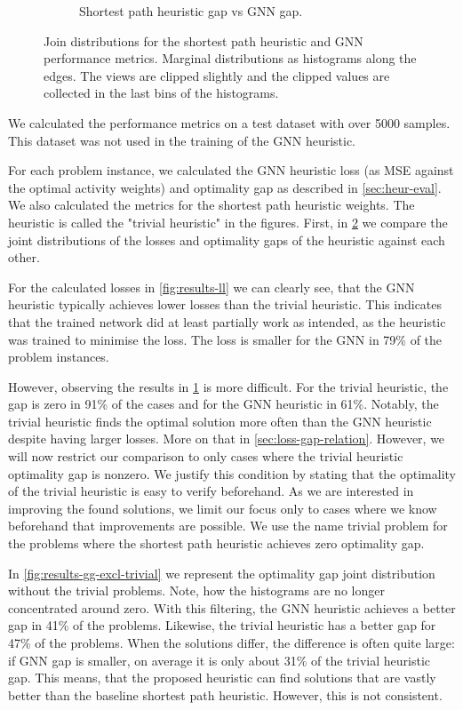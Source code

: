 \documentclass[english, 12pt, a4paper, sci, utf8, a-2b, online]{aaltothesis}
\begin{document}
\begin{figure}
\begin{subfigure}{0.5\textwidth}
        \caption{Shortest path heuristic gap vs GNN gap.}
        \label{fig:results-gg}
    \end{subfigure}
    \caption{Join distributions for the shortest path heuristic and GNN performance metrics. Marginal distributions as histograms along the edges. The views are clipped slightly and the clipped values are collected in the last bins of the histograms.}
    \label{fig:results-ll-gg}
\end{figure}

We calculated the performance metrics on a test dataset with over 5000 samples. This dataset was not used in the training of the GNN heuristic.

For each problem instance, we calculated the GNN heuristic loss (as MSE against the optimal activity weights) and optimality gap as described in \cref{sec:heur-eval}. We also calculated the metrics for the shortest path heuristic weights. The heuristic is called the "trivial heuristic" in the figures. First, in \cref{fig:results-ll-gg} we compare the joint distributions of the losses and optimality gaps of the heuristic against each other.

For the calculated losses in \cref{fig:results-ll} we can clearly see, that the GNN heuristic typically achieves lower losses than the trivial heuristic. This indicates that the trained network did at least partially work as intended, as the heuristic was trained to minimise the loss. The loss is smaller for the GNN in 79\% of the problem instances.

However, observing the results in \cref{fig:results-gg} is more difficult. For the trivial heuristic, the gap is zero in 91\% of the cases and for the GNN heuristic in 61\%. Notably, the trivial heuristic finds the optimal solution more often than the GNN heuristic despite having larger losses. More on that in \cref{sec:loss-gap-relation}. However, we will now restrict our comparison to only cases where the trivial heuristic optimality gap is nonzero. We justify this condition by stating that the optimality of the trivial heuristic is easy to verify beforehand. As we are interested in improving the found solutions, we limit our focus only to cases where we know beforehand that improvements are possible. We use the name trivial problem for the problems where the shortest path heuristic achieves zero optimality gap.

In \cref{fig:results-gg-excl-trivial} we represent the optimality gap joint distribution without the trivial problems. Note, how the histograms are no longer concentrated around zero. With this filtering, the GNN heuristic achieves a better gap in 41\% of the problems. Likewise, the trivial heuristic has a better gap for 47\% of the problems. When the solutions differ, the difference is often quite large: if GNN gap is smaller, on average it is only about 31\% of the trivial heuristic gap. This means, that the proposed heuristic can find solutions that are vastly better than the baseline shortest path heuristic. However, this is not consistent.
\end{document}
